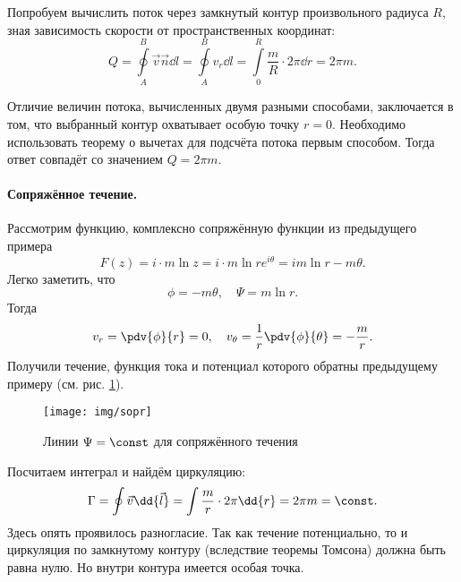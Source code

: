 Попробуем вычислить поток через замкнутый контур произвольного радиуса $R$, зная зависимость скорости от пространственных координат:
\begin{equation}
	Q=\oint\limits_{A}^{B} \vec{v}\vec{ n } \dd{l}=\oint\limits_{A}^{B} v_r \dd{l}=\int\limits_{0}^{R} \frac{m}{R} \cdot 2\pi \dd{r} =2\pi m.
\end{equation}

Отличие величин потока, вычисленных двумя разными способами, заключается в том, что выбранный контур охватывает особую точку $r=0$. Необходимо использовать теорему о вычетах для подсчёта потока первым способом. Тогда ответ совпадёт со значением $Q=2\pi m$.

\paragraph{Сопряжённое течение.} Рассмотрим функцию, комплексно сопряжённую функции из предыдущего примера
\begin{equation}
	F(z)=i\cdot m \ln{z}=i \cdot m \ln{re^{i \theta}}=im\ln{r}-m\theta.
\end{equation}
Легко заметить, что
\begin{equation}
	\phi=-m\theta, \quad
	\Psi=m\ln{r}.
\end{equation}
Тогда
\begin{equation}
	v_r=\pdv{\phi}{r}=0, \quad
	v_\theta=\frac{1}{r}\pdv{\phi}{\theta}=-\frac{m}{r}.
\end{equation}
Получили течение, функция тока и потенциал которого обратны предыдущему примеру (см. рис. \ref{fig:sopr_tech}).
\begin{figure}[H]
    \centering
    \texttt{[image: img/sopr]}
    \caption{Линии $\Psi=\const$ для сопряжённого течения}
    \label{fig:sopr_tech}
\end{figure}
\begin{comment}
Линии Psi=const
   ______
  /      \
 /  ._.   \
/  /   \   \
|  |   |   |
\  \._./   /
 \        /
  \______/
\end{comment}
Посчитаем интеграл и найдём циркуляцию:
\begin{equation}
	\Gamma=\oint \vec{v} \dd{\vec{l}}=\int \frac{m}{r}\cdot 2\pi \dd{r}=2\pi m = \const.
\end{equation}
Здесь опять проявилось разногласие. Так как течение потенциально, то и циркуляция  по замкнутому контуру (вследствие теоремы Томсона) должна быть равна нулю. Но внутри контура имеется особая точка.

